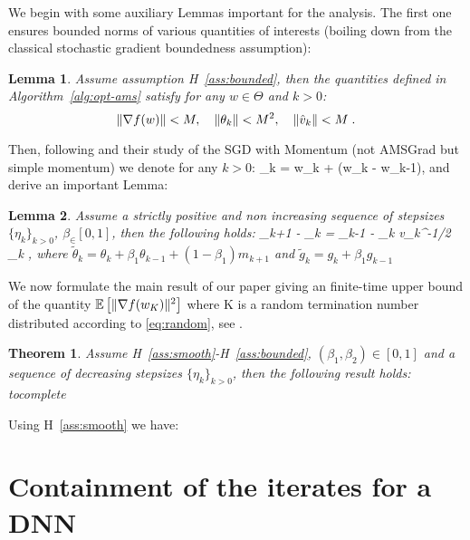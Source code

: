 \documentclass[11pt]{article}
\makeatletter
\newtheorem{Lemma}{Lemma}
\newtheorem{Theorem}{Theorem}
\renewenvironment{proof}[1][\proofname]{%
   \par\pushQED{\qed}\normalfont%
   \topsep6\p@\@plus6\p@\relax
   \trivlist\item[\hskip\labelsep\bfseries#1]%
   \ignorespaces
}{%
   \popQED\endtrivlist\@endpefalse
}
\theoremstyle{k}
\makeatother
\begin{document}
We begin with some auxiliary Lemmas important for the analysis. 
The first one ensures bounded norms of various quantities of interests (boiling down from the classical stochastic gradient boundedness assumption):
\begin{Lemma}
Assume assumption H~\ref{ass:bounded}, then the quantities defined in Algorithm~\ref{alg:opt-ams} satisfy for any $w \in \Theta$ and $k>0$:
$$ \|\nabla f(w)\| < M ,~~~\|\theta_k \| < M^2 ,~~~\|\hat{v}_k\| < M \;.$$
\end{Lemma}
Then, following \citep{yan2018unified} and their study of the SGD with Momentum (not AMSGrad but simple momentum) we denote for any $k >0$:
\beq
{}_k = w_k +  (w_k - w_{k-1})\eqsp,
\eeq
and derive an important Lemma:
\begin{Lemma}\label{lem:momentum}
Assume a strictly positive and non increasing sequence of stepsizes $\{\eta_k \}_{k>0}$, $\beta_ \in [0,1]$, then the following holds:
\beq
{}_{k+1} - _k =  \tilde{\theta}_{k-1}  - \eta_{k} v_{k}^{-1/2} _k \eqsp,
\eeq
where $\tilde{\theta}_{k} = \theta_k + \beta_1 \theta_{k-1} + (1 - \beta_1) m_{k+1} $ and $\tilde{g}_k = g_k + \beta_1 g_{k-1}$ 
\end{Lemma}


We now formulate the main result of our paper giving an finite-time upper bound of the quantity $\mathbb{E}\left[\|\nabla f(w_K)\|^2\right]$ where K is a random termination number distributed according to \ref{eq:random}, see \citep{ghadimi2013stochastic}.

\begin{Theorem}
Assume H~\ref{ass:smooth}-H~\ref{ass:bounded}, $(\beta_1, \beta_2) \in [0,1]$ and a sequence of decreasing stepsizes $\{\eta_k\}_{k>0}$, then the following result holds:
\beq
\EE{} \leq tocomplete
\eeq
\end{Theorem}
\begin{proof}
Using H~\ref{ass:smooth} we have:

\end{proof}
\section{Containment of the iterates for a DNN}


\newpage






\end{document}
